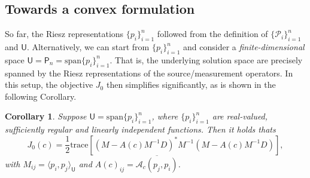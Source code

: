 \documentclass[12pt]{amsart}
\newtheorem{cor}{Corollary}
\begin{document}
\subsection{Towards a convex formulation}\label{sec:convex}
So far, the Riesz representations $\{p_i\}_{i=1}^n$ followed from the definition of $\{\mathcal{P}_i\}_{i=1}^n$ and $\mathsf{U}$. Alternatively, we can start from $\{p_i\}_{i=1}^n$ and consider a \emph{finite-dimensional} space $\mathsf{U} = \mathsf{P}_n = \text{span}\{p_i\}_{i=1}^n$. That is, the underlying solution space are precisely spanned by the Riesz representations of the source/measurement operators. In this setup, the objective $J_0$ then simplifies significantly, as is shown in the following Corollary.
\begin{cor}
\label{thm:quadratic}
Suppose $\mathsf{U} = \text{span}\{p_i\}_{i=1}^n$, where $\{p_i\}_{i=1}^n$ are real-valued, sufficiently regular and linearly independent functions. Then it holds thats
\begin{equation}
J_{0}(c) =  {\textstyle\frac{1}{2}}\text{trace}\left[\left(M - A(c)M^{-1}D\right)^*M^{-1}\left(M - A(c)M^{-1}D\right)\right],
\end{equation}
with $M_{ij} = \langle p_i, p_j \rangle_{\mathsf{U}}$ and $A(c)_{ij} = \overline{\mathcal{A}_c(p_j, p_i)}$.
\end{cor}
\end{document}
